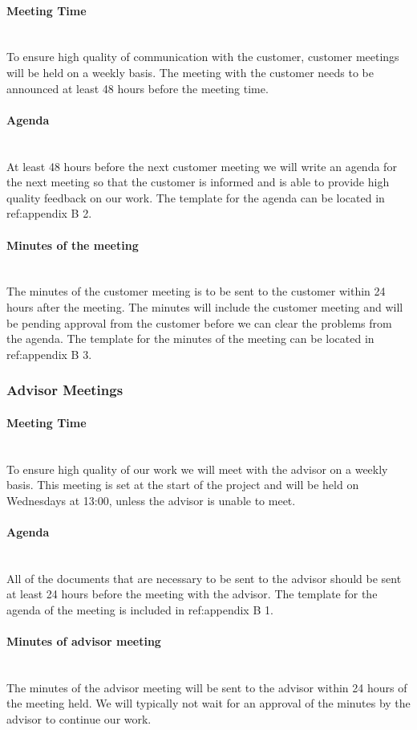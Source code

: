 \documentclass[../document.tex]{subfiles}
\begin{document}
\paragraph{Meeting Time} \ \\
To ensure high quality of communication with the customer, customer meetings will be held on a weekly basis. The meeting with the customer needs to be announced at least 48 hours before the meeting time.

\paragraph{Agenda} \ \\
At least 48 hours before the next customer meeting we will write an agenda for the next meeting so that the customer is informed and is able to provide high quality feedback on our work. The template for the agenda can be located in {\color{red} ref:}appendix B 2.

\paragraph{Minutes of the meeting} \ \\
The minutes of the customer meeting is to be sent to the customer within 24 hours after the meeting. The minutes will include the customer meeting and will be pending approval from the customer before we can clear the problems from the agenda. The template for the minutes of the meeting can be located in {\color{red} ref:}appendix B 3.

\subsubsection{Advisor Meetings}
\paragraph{Meeting Time} \ \\
To ensure high quality of our work we will meet with the advisor on a weekly basis. This meeting is set at the start of the project and will be held on Wednesdays at 13:00, unless the advisor is unable to meet.

\paragraph{Agenda} \ \\
All of the documents that are necessary to be sent to the advisor should be sent at least 24 hours before the meeting with the advisor. The template for the agenda of the meeting is included in {\color{red} ref:}appendix B 1.

\paragraph{Minutes of advisor meeting} \ \\
The minutes of the advisor meeting will be sent to the advisor within 24 hours of the meeting held. We will typically not wait for an approval of the minutes by the advisor to continue our work.
\end{document}
